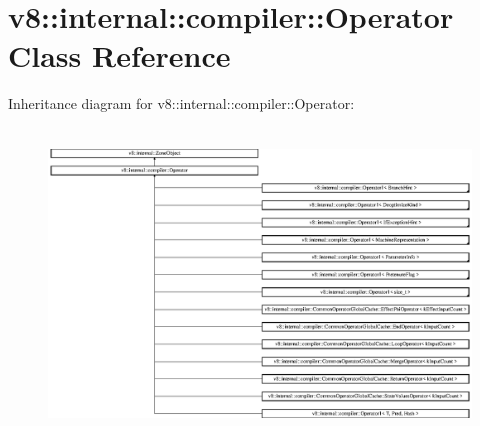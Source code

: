 \hypertarget{classv8_1_1internal_1_1compiler_1_1_operator}{}\section{v8\+:\+:internal\+:\+:compiler\+:\+:Operator Class Reference}
\label{classv8_1_1internal_1_1compiler_1_1_operator}
Inheritance diagram for v8\+:\+:internal\+:\+:compiler\+:\+:Operator\+:\begin{figure}[H]
\begin{center}
\leavevmode
\includegraphics[height=8.220183cm]{classv8_1_1internal_1_1compiler_1_1_operator}
\end{center}
\end{figure}
